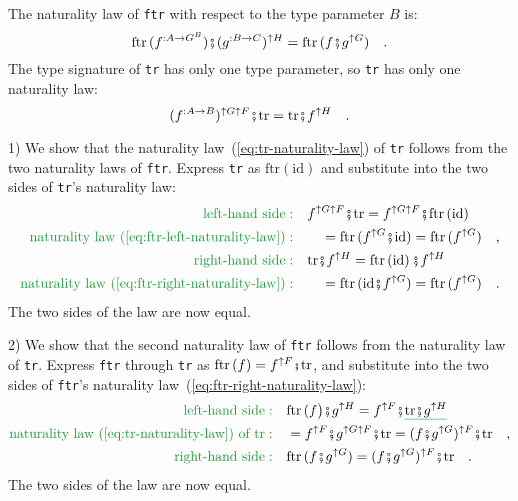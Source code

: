 The naturality law of \lstinline!ftr! with respect to the type parameter
$B$ is:
\begin{equation}
\text{ftr}\,(f^{:A\rightarrow G^{B}})\bef(g^{:B\rightarrow C})^{\uparrow H}=\text{ftr}\,(f\bef g^{\uparrow G})\quad.\label{eq:ftr-right-naturality-law}
\end{equation}
The type signature of \lstinline!tr! has only one type parameter,
so \lstinline!tr! has only one naturality law:
\begin{equation}
(f^{:A\rightarrow B})^{\uparrow G\uparrow F}\bef\text{tr}=\text{tr}\bef f^{\uparrow H}\quad.\label{eq:tr-naturality-law}
\end{equation}

1) We show that the naturality law~(\ref{eq:tr-naturality-law})
of \lstinline!tr! follows from the two naturality laws of \lstinline!ftr!.
Express \lstinline!tr! as $\text{ftr}\left(\text{id}\right)$ and
substitute into the two sides of \lstinline!tr!\textsf{'}s naturality law:
\begin{align*}
{\color{greenunder}\text{left-hand side}:}\quad & f^{\uparrow G\uparrow F}\bef\text{tr}=f^{\uparrow G\uparrow F}\bef\text{ftr}\left(\text{id}\right)\\
{\color{greenunder}\text{naturality law~(\ref{eq:ftr-left-naturality-law})}:}\quad & \quad=\text{ftr}\,(f^{\uparrow G}\bef\text{id})=\text{ftr}\,(f^{\uparrow G})\quad,\\
{\color{greenunder}\text{right-hand side}:}\quad & \text{tr}\bef f^{\uparrow H}=\text{ftr}\left(\text{id}\right)\bef f^{\uparrow H}\\
{\color{greenunder}\text{naturality law~(\ref{eq:ftr-right-naturality-law})}:}\quad & \quad=\text{ftr}\,(\text{id}\bef f^{\uparrow G})=\text{ftr}\,(f^{\uparrow G})\quad.
\end{align*}
The two sides of the law are now equal.

2) We show that the second naturality law of \lstinline!ftr! follows
from the naturality law of \lstinline!tr!. Express \lstinline!ftr!
through \lstinline!tr! as $\text{ftr}\,(f)=f^{\uparrow F}\bef\text{tr}$,
and substitute into the two sides of \lstinline!ftr!\textsf{'}s naturality
law~(\ref{eq:ftr-right-naturality-law}): 
\begin{align*}
{\color{greenunder}\text{left-hand side}:}\quad & \text{ftr}\,(f\big)\bef g^{\uparrow H}=f^{\uparrow F}\bef\gunderline{\text{tr}\bef g^{\uparrow H}}\\
{\color{greenunder}\text{naturality law~(\ref{eq:tr-naturality-law}) of }\text{tr}:}\quad & =f^{\uparrow F}\bef g^{\uparrow G\uparrow F}\bef\text{tr}=(f\bef g^{\uparrow G})^{\uparrow F}\bef\text{tr}\quad,\\
{\color{greenunder}\text{right-hand side}:}\quad & \text{ftr}\,(f\bef g^{\uparrow G})=(f\bef g^{\uparrow G})^{\uparrow F}\bef\text{tr}\quad.
\end{align*}
The two sides of the law are now equal.

